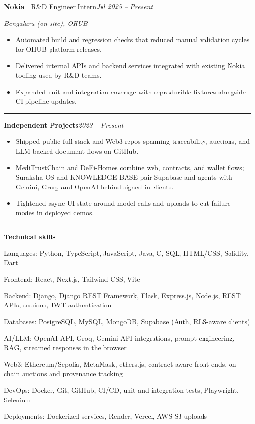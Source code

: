 \documentclass[10pt,a4paper]{article}
\newcommand{\atsection}[1]{%
  \par\addvspace{10pt}%
  \noindent\rule{\linewidth}{0.6pt}%
  \par\vspace{4pt}%
  {\large\bfseries #1}%
  \par\vspace{6pt}%
}
\newcommand{\thinhrule}{%
  \par\vspace{2pt}\noindent\textcolor{metagray}{\rule{\linewidth}{0.35pt}}\par\vspace{3pt}%
}
\begin{document}
{\small
\noindent\textbf{Nokia}\ \textemdash\ R\&D Engineer Intern\hfill\textcolor{metagray}{\textit{Jul 2025 -- Present}}\par
\noindent\textcolor{metagray}{\textit{Bengaluru (on-site), OHUB}}\par
\vspace{0.06em}
\begin{itemize}
  \item Automated build and regression checks that reduced manual validation cycles for OHUB platform releases.
  \item Delivered internal APIs and backend services integrated with existing Nokia tooling used by R\&D teams.
  \item Expanded unit and integration coverage with reproducible fixtures alongside CI pipeline updates.
\end{itemize}

\thinhrule

\noindent\textbf{Independent Projects}\hfill\textcolor{metagray}{\textit{2023 -- Present}}\par
\vspace{0.06em}
\begin{itemize}
  \item Shipped public full-stack and Web3 repos spanning traceability, auctions, and LLM-backed document flows on GitHub.
  \item MediTrustChain and DeFi-Homes combine web, contracts, and wallet flows; Suraksha OS and KNOWLEDGE-BASE pair Supabase and agents with Gemini, Groq, and OpenAI behind signed-in clients.
  \item Tightened async UI state around model calls and uploads to cut failure modes in deployed demos.
\end{itemize}
}

\atsection{Technical skills}
\setlength{\fboxsep}{7pt}
\noindent\colorbox{gray!7}{%
  \parbox{\dimexpr\textwidth-2\fboxsep\relax}{%
    {\small
    \setlength{\parskip}{3pt}
    \textcolor{metagray}{Languages:} Python, TypeScript, JavaScript, Java, C, SQL, HTML/CSS, Solidity, Dart

    \textcolor{metagray}{Frontend:} React, Next.js, Tailwind CSS, Vite

    \textcolor{metagray}{Backend:} Django, Django REST Framework, Flask, Express.js, Node.js, REST APIs, sessions, JWT authentication

    \textcolor{metagray}{Databases:} PostgreSQL, MySQL, MongoDB, Supabase (Auth, RLS-aware clients)

    \textcolor{metagray}{AI/LLM:} OpenAI API, Groq, Gemini API integrations, prompt engineering, RAG, streamed responses in the browser

    \textcolor{metagray}{Web3:} Ethereum/Sepolia, MetaMask, ethers.js, contract-aware front ends, on-chain auctions and provenance tracking

    \textcolor{metagray}{DevOps:} Docker, Git, GitHub, CI/CD, unit and integration tests, Playwright, Selenium

    \textcolor{metagray}{Deployments:} Dockerized services, Render, Vercel, AWS S3 uploads
    }%
  }%
}
\end{document}

